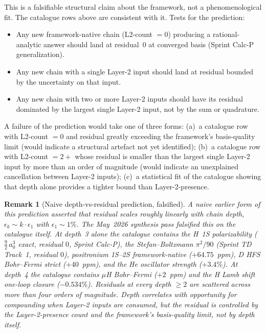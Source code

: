 \documentclass[11pt]{article}
\newtheorem{remark}{Remark}
\begin{document}
This is a falsifiable structural claim about the framework, not a
phenomenological fit.  The catalogue rows above are consistent
with it.  Tests for the prediction:
\begin{itemize}\setlength\itemsep{0pt}
\item Any new framework-native chain (L2-count $= 0$) producing a
rational-analytic answer should land at residual~$0$ at converged
basis (Sprint Calc-P generalization).
\item Any new chain with a single Layer-2 input should land at
residual bounded by the uncertainty on that input.
\item Any new chain with two or more Layer-2 inputs should have
its residual dominated by the largest single Layer-2 input,
not by the sum or quadrature.
\end{itemize}
A failure of the prediction would take one of three forms:
(a)~a catalogue row with L2-count $= 0$ and residual greatly
exceeding the framework's basis-quality limit (would indicate a
structural artefact not yet identified); (b)~a catalogue row with
L2-count $= 2+$ whose residual is smaller than the largest
single Layer-2 input by more than an order of magnitude (would
indicate an unexplained cancellation between Layer-2 inputs);
(c)~a statistical fit of the catalogue showing that depth alone
provides a tighter bound than Layer-2-presence.

\begin{remark}[Naive depth-vs-residual prediction, falsified]
\label{rem:depth_falsification}
A naive earlier form of this prediction asserted that residual
scales roughly linearly with chain depth, $\epsilon_k \sim k \cdot
\epsilon_1$ with $\epsilon_1 \sim 1\%$.  The May~2026 synthesis
pass falsified this on the catalogue itself.  At depth~3 alone the
catalogue contains the H~1S polarizability ($\tfrac{9}{2}\,a_0^3$
exact, residual $0$, Sprint Calc-P), the Stefan--Boltzmann
$\pi^2/90$ (Sprint TD Track~1, residual $0$), positronium 1S--2S
framework-native ($+64.75$~ppm), D HFS Bohr--Fermi strict
($+40$~ppm), and the He oscillator strength ($+3.4\%$).  At depth~4
the catalogue contains $\mu$H Bohr--Fermi ($+2$~ppm) and the H
Lamb shift one-loop closure ($-0.534\%$).  Residuals at every
depth $\geq 2$ are scattered across more than four orders of
magnitude.  Depth correlates with \emph{opportunity} for
compounding when Layer-2 inputs are consumed, but the residual is
controlled by the Layer-2-presence count and the framework's
basis-quality limit, not by depth itself.
\end{remark}
\end{document}

